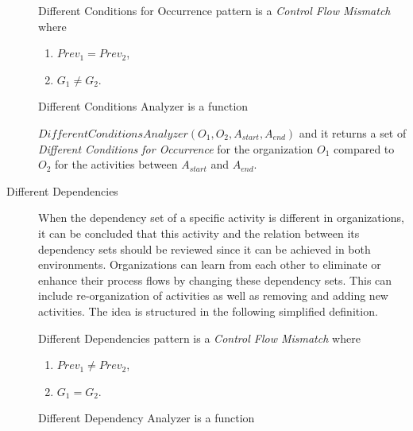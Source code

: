 \begin{description}
		\theoremstyle{definition}
		\begin{definition}
		Different Conditions for Occurrence pattern is a \textit{Control Flow Mismatch} where
		\begin{enumerate}
			\item $Prev_{1} = Prev_{2}$,
			\item $G_{1} \neq G_{2}$.
		\end{enumerate}
		\end{definition}

		\theoremstyle{definition}
		\begin{definition}
		Different Conditions Analyzer is a function 

		$DifferentConditionsAnalyzer(O_{1}, O_{2}, A_{start}, A_{end})$ and it returns a set of \textit{Different Conditions for Occurrence} for the organization $O_{1}$ compared to $O_{2}$ for the activities between $A_{start}$ and $A_{end}$.
		\end{definition}	

	\item[Different Dependencies] When the dependency set of a specific activity is different in organizations, it can be concluded that this activity and the relation between its dependency sets should be reviewed since it can be achieved in both environments. Organizations can learn from each other to eliminate or enhance their process flows by changing these dependency sets. This can include re-organization of activities as well as removing and adding new activities. The idea is structured in the following simplified definition.
		\theoremstyle{definition}
		\begin{definition}
		Different Dependencies pattern is a \textit{Control Flow Mismatch} where
		\begin{enumerate}
			\item $Prev_{1} \neq Prev_{2}$,
			\item $G_{1} = G_{2}$.
		\end{enumerate}
		\end{definition}

		\theoremstyle{definition}
		\begin{definition}
		Different Dependency Analyzer is a function 


\end{definition}
\end{description}
